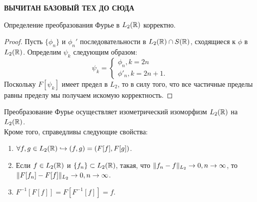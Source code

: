 \textbf{ВЫЧИТАН БАЗОВЫЙ ТЕХ ДО СЮДА}


\begin{theorem}
    Определение преобразования Фурье в $L_2(\mathbb{R})$ корректно.
\end{theorem}
\begin{proof}
    Пусть $\{\phi_n\}$ и $\phi_n'$ последовательности в $L_2(\mathbb{R}) \cap S(\mathbb{R})$, сходящиеся к $\phi$ в $L_2(\mathbb{R})$.
    Определим $\psi_k$ следующим образом:
    \[
        \psi_k = \begin{cases}
                     \phi_n, k = 2n \\
                     \phi'_n, k = 2n + 1.
        \end{cases}
    \]
    Поскольку $F[\psi_k]$ имеет предел в $L_2$, то в силу того, что все частичные пределы равны пределу мы получаем искомую корректность.
\end{proof}
\begin{theorem}
    Преобразование Фурье осуществляет изометрический изоморфизм $L_2(\mathbb{R})$ на $L_2(\mathbb{R})$. \\
    Кроме того, справедливы следующие свойства:
    \begin{enumerate}
        \item $\forall f, g \in L_2(\mathbb{R}) \hookrightarrow (f, g) = (F[f], F[g])$.
        \item Если $f \in L_2(\mathbb{R})$ и $\{f_n\} \subset L_2(\mathbb{R})$, такая, что $\|f_n - f\|_{L_2} \rightarrow 0, n \rightarrow \infty$, то $\|F[f_n] - F[f]\|_{L_2} \rightarrow 0, n \rightarrow \infty$.
        \item $F^{-1}[F[f]] = F[F^{-1}[f]] = f$.
    \end{enumerate}
\end{theorem}
